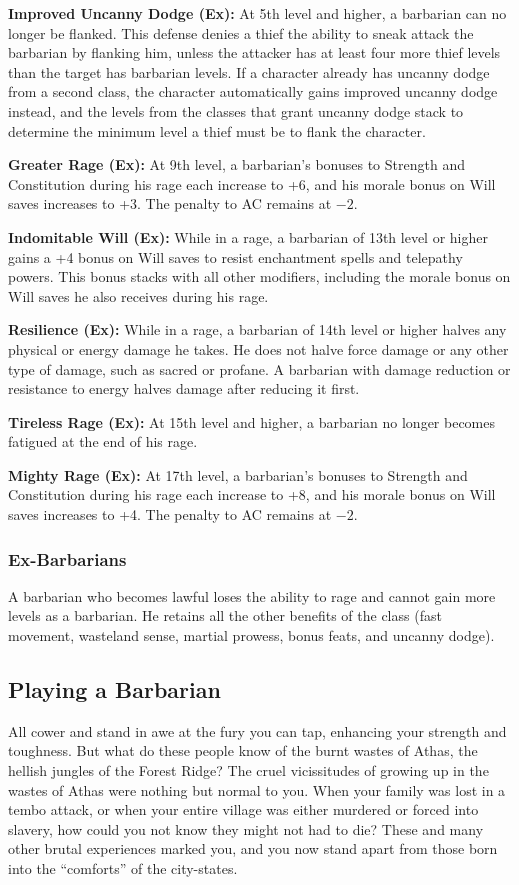 \textbf{Improved Uncanny Dodge (Ex):} At 5th level and higher, a barbarian can no longer be flanked. This defense denies a thief the ability to sneak attack the barbarian by flanking him, unless the attacker has at least four more thief levels than the target has barbarian levels. If a character already has uncanny dodge from a second class, the character automatically gains improved uncanny dodge instead, and the levels from the classes that grant uncanny dodge stack to determine the minimum level a thief must be to flank the character.

\textbf{Greater Rage (Ex):} At 9th level, a barbarian's bonuses to Strength and Constitution during his rage each increase to +6, and his morale bonus on Will saves increases to +3. The penalty to AC remains at $-2$.

\textbf{Indomitable Will (Ex):} While in a rage, a barbarian of 13th level or higher gains a +4 bonus on Will saves to resist enchantment spells and telepathy powers. This bonus stacks with all other modifiers, including the morale bonus on Will saves he also receives during his rage.

\textbf{Resilience (Ex):} While in a rage, a barbarian of 14th level or higher halves any physical or energy damage he takes. He does not halve force damage or any other type of damage, such as sacred or profane. A barbarian with damage reduction or resistance to energy halves damage after reducing it first.

\textbf{Tireless Rage (Ex):} At 15th level and higher, a barbarian no longer becomes fatigued at the end of his rage.

\textbf{Mighty Rage (Ex):} At 17th level, a barbarian's bonuses to Strength and Constitution during his rage each increase to +8, and his morale bonus on Will saves increases to +4. The penalty to AC remains at $-2$.

\subsubsection{Ex-Barbarians}
A barbarian who becomes lawful loses the ability to rage and cannot gain more levels as a barbarian. He retains all the other benefits of the class (fast movement, wasteland sense, martial prowess, bonus feats, and uncanny dodge).


\subsection{Playing a Barbarian}
All cower and stand in awe at the fury you can tap, enhancing your strength and toughness. But what do these people know of the burnt wastes of Athas, the hellish jungles of the Forest Ridge? The cruel vicissitudes of growing up in the wastes of Athas were nothing but normal to you. When your family was lost in a tembo attack, or when your entire village was either murdered or forced into slavery, how could you not know they might not had to die? These and many other brutal experiences marked you, and you now stand apart from those born into the ``comforts'' of the city-states.

